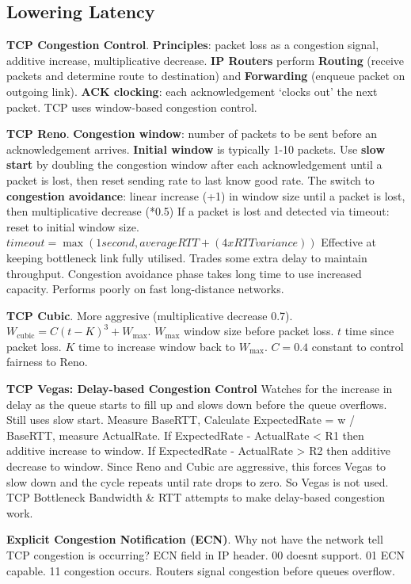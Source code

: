 \documentclass{article}
\begin{document}
\subsection*{Lowering Latency}

\noindent \textbf{TCP Congestion Control}.
\textbf{Principles}: packet loss as a congestion signal, additive increase, multiplicative decrease.
\textbf{IP Routers} perform \textbf{Routing} (receive packets and determine route to destination) and
\textbf{Forwarding} (enqueue packet on outgoing link).
\textbf{ACK clocking}: each acknowledgement `clocks out' the next packet.
TCP uses window-based congestion control.

\noindent \textbf{TCP Reno}.
\textbf{Congestion window}: number of packets to be sent before an acknowledgement arrives.
\textbf{Initial window} is typically 1-10 packets.
Use \textbf{slow start} by doubling the congestion window after each acknowledgement until a packet is lost,
then reset sending rate to last know good rate.
The switch to \textbf{congestion avoidance}: linear increase (+1) in window size until a packet is lost, then multiplicative decrease (*0.5)
If a packet is lost and detected via timeout: reset to initial window size.
$timeout = \max(1 second, average RTT + (4 x RTT variance))$
Effective at keeping bottleneck link fully utilised.
Trades some extra delay to maintain throughput.
Congestion avoidance phase takes long time to use increased capacity.
Performs poorly on fast long-distance networks.

\noindent \textbf{TCP Cubic}.
More aggresive (multiplicative decrease 0.7).
$W_{\text{cubic}} = C (t - K)^3 + W_{\text{max}}$.
$W_{\text{max}}$ window size before packet loss.
$t$ time since packet loss.
$K$ time to increase window back to $W_{\text{max}}$.
$C = 0.4$ constant to control fairness to Reno.

\noindent \textbf{TCP Vegas: Delay-based Congestion Control}
Watches for the increase in delay as the queue starts to fill up and slows down before the queue overflows.
Still uses slow start.
Measure BaseRTT, Calculate ExpectedRate = w / BaseRTT, measure ActualRate.
If ExpectedRate - ActualRate < R1 then additive increase to window.
If ExpectedRate - ActualRate > R2 then additive decrease to window.
Since Reno and Cubic are aggressive, this forces Vegas to slow down and the cycle repeats until rate drops to zero.
So Vegas is not used. TCP Bottleneck Bandwidth \& RTT attempts to make delay-based congestion work.

\noindent \textbf{Explicit Congestion Notification (ECN)}.
Why not have the network tell TCP congestion is occurring? ECN field in IP header.
00 doesnt support.
01 ECN capable.
11 congestion occurs.
Routers signal congestion before queues overflow.
\end{document}
